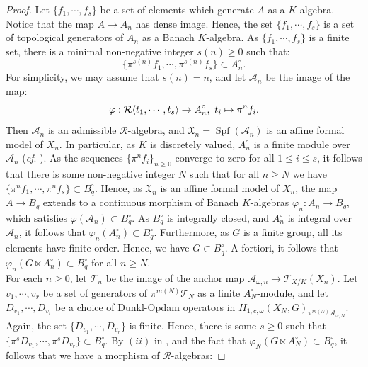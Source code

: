 \documentclass{amsart}
\newcommand{\Spf}{\operatorname{Spf}}
\begin{document}
\begin{proof}
Let $\{f_1,\cdots,f_s\}$ be a set of elements which generate $A$ as a $K$-algebra. Notice that the map $A\rightarrow A_n$ has dense image. Hence, the set $\{f_1,\cdots,f_s\}$ is a set of topological generators of $A_n$
as a Banach $K$-algebra. As $\{f_1,\cdots,f_s\}$ is a finite set, there is a minimal non-negative integer $s(n)\geq 0$ such that:
\begin{equation*}
    \{\pi^{s(n)}f_1,\cdots,\pi^{s(n)}f_s\}\subset A_n^{\circ}.
\end{equation*}
For simplicity, we may assume that $s(n)=n$, and let $\mathcal{A}_n$ be the image of the map:
\begin{equation*}
    \varphi:\mathcal{R}\langle t_1,\cdots, t_s\rangle\rightarrow A_n^{\circ}, \textnormal{ }t_i\mapsto \pi^nf_i.
\end{equation*}
Then $\mathcal{A}_n$ is an admissible $\mathcal{R}$-algebra, and $\mathfrak{X}_n=\Spf(\mathcal{A}_n)$ is an affine formal model of $X_n$. In particular, as $K$ is discretely valued, $A^{\circ}_n$ is a finite module over $\mathcal{A}_{n}$  (\emph{cf}. \cite[6.4.1 Corollary 6]{BGR}). As the sequences $\{\pi^nf_i\}_{n\geq 0}$ converge to zero for all $1\leq i\leq s$, it follows that there is some non-negative integer $N$ such that for all $n\geq N$ we have $\{\pi^nf_1,\cdots, \pi^nf_s \}\subset B^{\circ}_q$. Hence, as $\mathfrak{X}_n$ is an affine formal model of $X_n$, the map $A\rightarrow B_q$ extends to a continuous morphism of Banach $K$-algebras $\varphi_n:A_n\rightarrow B_q$, which satisfies $\varphi(\mathcal{A}_n)\subset B_q^{\circ}$. As $B^{\circ}_q$ is integrally closed, and $A^{\circ}_n$ is integral over $\mathcal{A}_n$, it follows that $\varphi_n(A_n^{\circ})\subset B^{\circ}_q$. Furthermore, as  $G$ is a finite group, all its elements have finite order. Hence, we have $G\subset B_q^{\circ}$. A fortiori, it follows that $\varphi_n(G\ltimes A_n^{\circ})\subset B_q^{\circ}$ for all $n\geq N$.\\
For each $n\geq 0$, let $\mathscr{T}_n$ be the image of the anchor map $\mathscr{A}_{\omega,n}\rightarrow \mathcal{T}_{X/K}(X_n)$. Let $v_1,\cdots,v_r$ be a set of generators of $\pi^{m(N)}\mathscr{T}_N$ as a finite $A^{\circ}_N$-module, and let $D_{v_1},\cdots, D_{v_r}$ be a choice of Dunkl-Opdam operators in  
$H_{1,c,\omega}(X_N,G)_{\pi^{m(N)}\mathscr{A}_{\omega,N}}$.  Again, the set $\{D_{v_1},\cdots, D_{v_r}\}$ is finite. Hence, there is some  $s\geq 0$  such that $\{\pi^sD_{v_1},\cdots, \pi^sD_{v_r}\}\subset B_q^{\circ}$. By $(ii)$ in \cite[Proposition 3.1.8]{p-adicCheralg}, and the fact that $\varphi_N(G\ltimes A^{\circ}_N)\subset B_q^{\circ}$, it follows that we have a morphism of $\mathcal{R}$-algebras: 

\end{proof}
\end{document}
